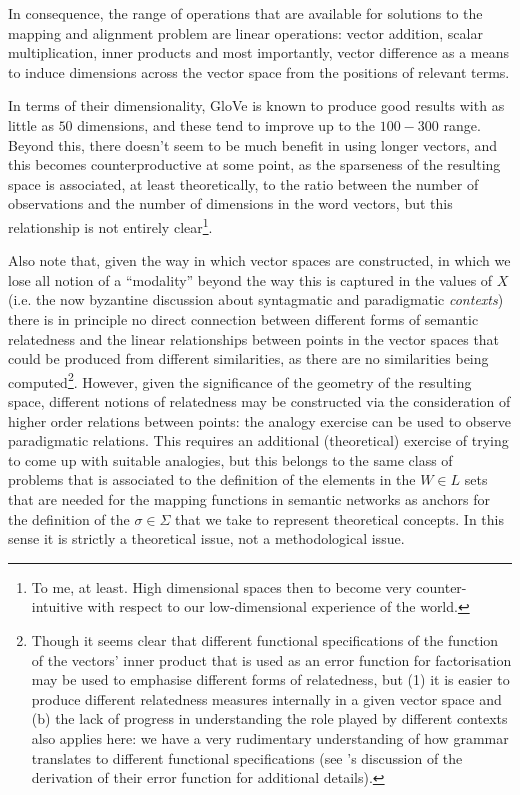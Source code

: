 In consequence, the range of operations that are available for solutions to the mapping and alignment problem are linear operations: vector addition, scalar multiplication, inner products and most importantly, vector difference as a means to induce dimensions across the vector space from the positions of relevant terms.

In terms of their dimensionality, GloVe is known to produce good results with as little as $50$ dimensions, and these tend to improve up to the $100-300$ range.
Beyond this, there doesn't seem to be much benefit in using longer vectors, and this becomes counterproductive at some point, as the sparseness of the resulting space is associated, at least theoretically, to the ratio between the number of observations and the number of dimensions in the word vectors, but this relationship is not entirely clear\footnote{
    To me, at least.
    High dimensional spaces then to become very counter-intuitive with respect to our low-dimensional experience of the world.
}.

Also note that, given the way in which vector spaces are constructed, in which we lose all notion of a ``modality'' beyond the way this is captured in the values of $X$ (i.e. the now byzantine discussion about syntagmatic and paradigmatic \emph{contexts}) there is in principle no direct connection between different forms of semantic relatedness and the linear relationships between points in the vector spaces that could be produced from different similarities, as there are no similarities being computed\footnote{
    Though it seems clear that different functional specifications of the function of the vectors' inner product that is used as an error function for factorisation may be used to emphasise different forms of relatedness, but (1) it is easier to produce different relatedness measures internally in a given vector space and (b) the lack of progress in understanding the role played by different contexts also applies here: we have a very rudimentary understanding of how grammar translates to different functional specifications (see \citeauthor{pennington2014}'s discussion of the derivation of their error function for additional details).
}.
However, given the significance of the geometry of the resulting space, different notions of relatedness may be constructed via the consideration of higher order relations between points: the analogy exercise can be used to observe paradigmatic relations.
This requires an additional (theoretical) exercise of trying to come up with suitable analogies, but this belongs to the same class of problems that is associated to the definition of the elements in the $W \in L$ sets that are needed for the mapping functions in semantic networks as anchors for the definition of the $\sigma \in \Sigma$ that we take to represent theoretical concepts.
In this sense it is strictly a theoretical issue, not a methodological issue.

